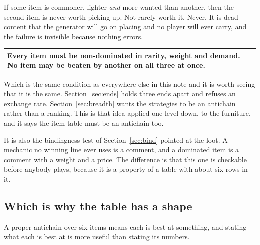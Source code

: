 \documentclass[11pt,a4paper]{article}
\begin{document}
If some item is commoner, lighter \emph{and} more wanted than another, then the second item is
never worth picking up. Not rarely worth it. Never. It is dead content that the generator will go
on placing and no player will ever carry, and the failure is invisible because nothing errors.

\begin{center}
\begin{tabular}{@{}>{\raggedright\arraybackslash}p{}@{}}
\toprule
\textbf{Every item must be non-dominated in rarity, weight and demand.} No item may be beaten by
another on all three at once. \\
\bottomrule
\end{tabular}
\end{center}

Which is the same condition as everywhere else in this note and it is worth seeing that it is the
same. Section~\ref{sec:ends} holds three ends apart and refuses an exchange rate.
Section~\ref{sec:breadth} wants the strategies to be an antichain rather than a ranking. This is
that idea applied one level down, to the furniture, and it says the item table must be an antichain
too.

\begin{alarmbox}
It is also the bindingness test of Section~\ref{sec:bind} pointed at the loot. A mechanic no
winning line ever uses is a comment, and a dominated item is a comment with a weight and a price.
The difference is that this one is checkable before anybody plays, because it is a property of a
table with about six rows in it.
\end{alarmbox}

\subsection{Which is why the table has a shape}

A proper antichain over six items means each is best at something, and stating what each is best at
is more useful than stating its numbers.
\end{document}
